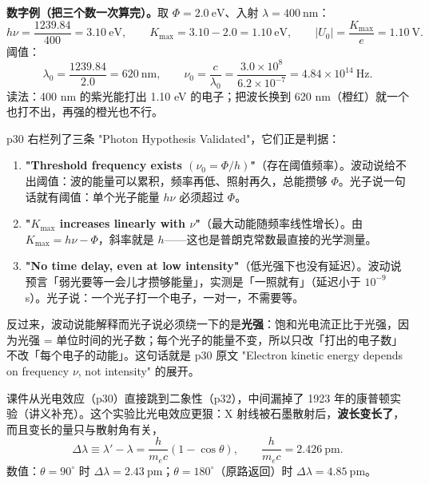 \documentclass[11pt]{ctexart}
\newcommand{\cpage}[1]{\textsf{p#1}}
\begin{document}
\textbf{数字例（把三个数一次算完）。}取 $\Phi=2.0\ \mathrm{eV}$、入射 $\lambda=400\ \mathrm{nm}$：
\[
h\nu=\frac{1239.84}{400}=3.10\ \mathrm{eV},\qquad
K_{\max}=3.10-2.0=1.10\ \mathrm{eV},\qquad
|U_0|=\frac{K_{\max}}{e}=1.10\ \mathrm{V}.
\]
阈值：
\[
\lambda_0=\frac{1239.84}{2.0}=620\ \mathrm{nm},\qquad
\nu_0=\frac{c}{\lambda_0}=\frac{3.0\times10^{8}}{6.2\times10^{-7}}=4.84\times10^{14}\ \mathrm{Hz}.
\]
读法：400 nm 的紫光能打出 1.10 eV 的电子；把波长换到 620 nm（橙红）就一个也打不出，再强的橙光也不行。


\subhdr{6.4 三条实验事实，逐条对上（\cpage{30}）}

\cpage{30} 右栏列了三条 "Photon Hypothesis Validated"，它们正是判据：

\begin{enumerate}
\item \textbf{"Threshold frequency exists $(\nu_0=\Phi/h)$"}（存在阈值频率）。波动说给不出阈值：波的能量可以累积，频率再低、照射再久，总能攒够 $\Phi$。光子说一句话就有阈值：单个光子能量 $h\nu$ 必须超过 $\Phi$。
\item \textbf{"$K_{\max}$ increases linearly with $\nu$"}（最大动能随频率线性增长）。由 $K_{\max}=h\nu-\Phi$，斜率就是 $h$——这也是普朗克常数最直接的光学测量。
\item \textbf{"No time delay, even at low intensity"}（低光强下也没有延迟）。波动说预言「弱光要等一会儿才攒够能量」，实测是「一照就有」（延迟小于 $10^{-9}$ s）。光子说：一个光子打一个电子，一对一，不需要等。
\end{enumerate}

反过来，波动说能解释而光子说必须绕一下的是\textbf{光强}：饱和光电流正比于光强，因为光强 = 单位时间的光子数；每个光子的能量不变，所以只改「打出的电子数」不改「每个电子的动能」。这句话就是 \cpage{30} 原文 "Electron kinetic energy depends on frequency $\nu$, not intensity" 的展开。


课件从光电效应（\cpage{30}）直接跳到二象性（\cpage{32}），中间漏掉了 1923 年的康普顿实验（讲义补充）。这个实验比光电效应更狠：X 射线被石墨散射后，\textbf{波长变长了}，而且变长的量只与散射角有关，
\[
\Delta\lambda\equiv\lambda'-\lambda=\frac{h}{m_ec}(1-\cos\theta),
\qquad \frac{h}{m_ec}=2.426\ \mathrm{pm}.
\]
数值：$\theta=90^\circ$ 时 $\Delta\lambda=2.43\ \mathrm{pm}$；$\theta=180^\circ$（原路返回）时 $\Delta\lambda=4.85\ \mathrm{pm}$。
\end{document}
